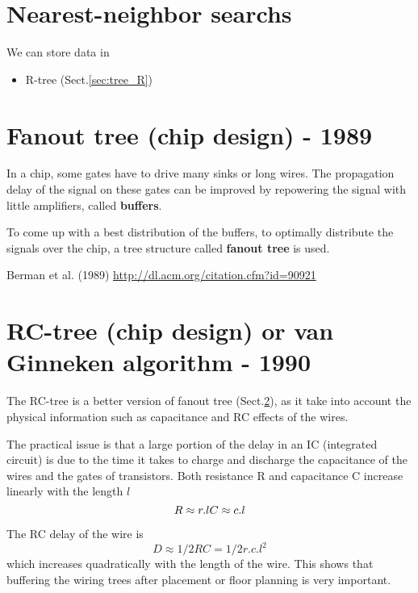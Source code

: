 \section{Nearest-neighbor searchs}


We can store data in
\begin{itemize}
  \item R-tree (Sect.\ref{sec:tree_R})
\end{itemize}


\section{Fanout tree (chip design) - 1989}
\label{sec:tree_fanout}

In a chip, some gates have to drive many sinks or long wires. 
The propagation delay of the signal on these gates can be improved by repowering the signal with little amplifiers, called {\bf buffers}.

To come up with a best distribution of the buffers, to optimally distribute the
signals over the chip, a tree structure called {\bf fanout tree} is used.
 
Berman et al. (1989) 
\url{http://dl.acm.org/citation.cfm?id=90921}


\section{RC-tree (chip design) or van Ginneken algorithm - 1990}
\label{sec:tree_RC}

The RC-tree is a better version of fanout tree (Sect.\ref{sec:tree_fanout}), as it take into account the physical information such as capacitance and RC effects of the wires.

The practical issue is that a large portion of the delay in an IC (integrated circuit) is due to the time it takes to charge and discharge the capacitance
of the wires and the gates of transistors. Both resistance R and capacitance C increase linearly with the length $l$
\begin{equation}
R \approx   r.l \\
C \approx c.l
\end{equation}

The RC delay of the wire is 
\begin{equation}
D \approx 1/2RC = 1/2 r.c.l^2
\end{equation}
which increases quadratically with the length of the wire. This shows that buffering the wiring trees after placement or floor planning is very important.

